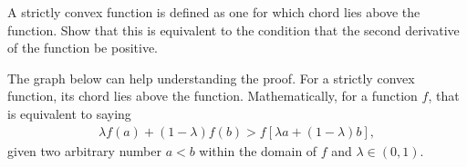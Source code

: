 \begin{question}{1.36}
	A strictly convex function is defined as one for which chord lies above the function. Show that this is equivalent to the condition that the second derivative of the function be positive.
\end{question}

\begin{answer}{}
	The graph below can help understanding the proof. For a strictly convex function, its chord lies above the function. Mathematically, for a function $f$, that is equivalent to saying
	\begin{align}\label{1.36eqn1}
		\lambda f(a) + (1-\lambda) f(b) > f\left[ \lambda a + (1-\lambda)b \right],
	\end{align}
	given two arbitrary number $a < b$ within the domain of $f$ and $\lambda \in (0, 1)$. 
	\begin{figure*}[h]
		\centering
	\end{figure*}


\end{answer}
